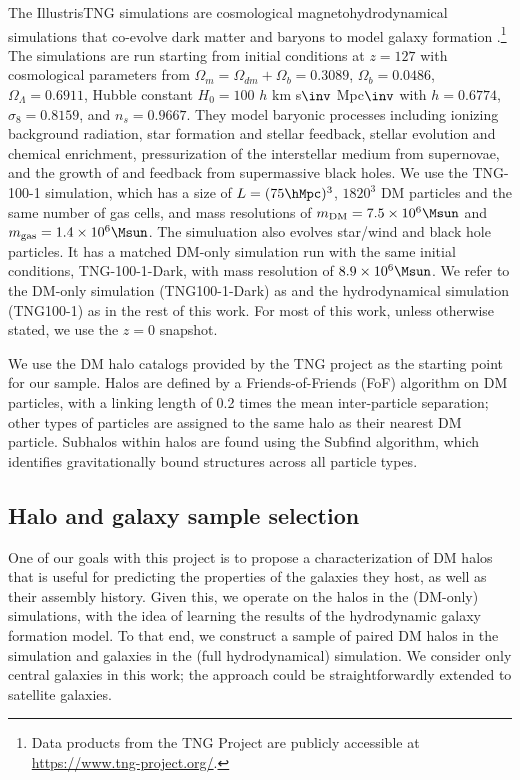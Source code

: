 The IllustrisTNG simulations are cosmological magnetohydrodynamical simulations that co-evolve dark matter and baryons to model galaxy formation \citep{springel_first_2018,nelson_first_2018,pillepich_first_2018,naiman_first_2018,marinacci_first_2018}.\footnote{Data products from the TNG Project are publicly accessible at \url{https://www.tng-project.org/}.}
The simulations are run starting from initial conditions at $z=127$ with cosmological parameters from \cite{ade_planck_2016} $\Omega_m = \Omega_{dm} + \Omega_b = 0.3089$, $\Omega_b = 0.0486$, $\Omega_\Lambda = 0.6911$, Hubble constant $H_0 = 100$ $h$ km s$\inv$ Mpc$\inv$ with $h = 0.6774$, $\sigma_8 = 0.8159$, and $n_s = 0.9667$.
They model baryonic processes including ionizing background radiation, star formation and stellar feedback, stellar evolution and chemical enrichment, pressurization of the interstellar medium from supernovae, and the growth of and feedback from supermassive black holes.   
We use the TNG-100-1 simulation, which has a size of $L = (75 \hMpc)^3$, $1820^3$ DM particles and the same number of gas cells, and mass resolutions of $m_\text{DM} = 7.5 \times 10^6 \Msun$ and $m_\text{gas} = 1.4 \times 10^6 \Msun$.
The simuluation also evolves star/wind and black hole particles.
It has a matched DM-only simulation run with the same initial conditions, TNG-100-1-Dark, with mass resolution of $8.9 \times 10^6 \Msun$.
We refer to the DM-only simulation (TNG100-1-Dark) as \dark and the hydrodynamical simulation (TNG100-1) as \hydro in the rest of this work.
For most of this work, unless otherwise stated, we use the $z=0$ snapshot.

We use the DM halo catalogs provided by the TNG project as the starting point for our sample.
Halos are defined by a Friends-of-Friends (FoF) algorithm on DM particles, with a linking length of 0.2 times the mean inter-particle separation; other types of particles are assigned to the same halo as their nearest DM particle.
Subhalos within halos are found using the Subfind algorithm, which identifies gravitationally bound structures across all particle types.


\subsection{Halo and galaxy sample selection}
\label{sec:select}

One of our goals with this project is to propose a characterization of DM halos that is useful for predicting the properties of the galaxies they host, as well as their assembly history.
Given this, we operate on the halos in the \dark (DM-only) simulations, with the idea of learning the results of the hydrodynamic galaxy formation model.
To that end, we construct a sample of paired DM halos in the \dark simulation and galaxies in the \hydro (full hydrodynamical) simulation. 
We consider only central galaxies in this work; the approach could be straightforwardly extended to satellite galaxies.

